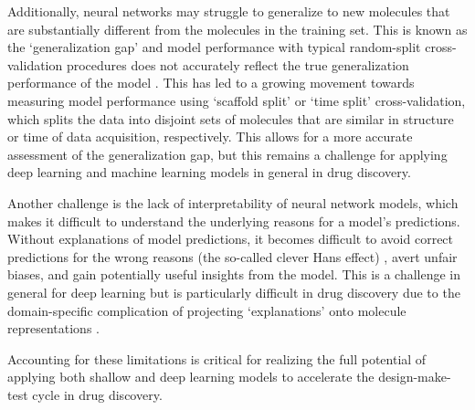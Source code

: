 Additionally, neural networks may struggle to generalize to new molecules that are substantially different from the molecules in the training set. This is known as the `generalization gap' and model performance with typical random-split cross-validation procedures does not accurately reflect the true generalization performance of the model \cite{Sheridan2013TimeSplit}. This has led to a growing movement towards measuring model performance using `scaffold split' \cite{wu2017molnet, yang2019chemprop} or `time split' \cite{Sheridan2013TimeSplit} cross-validation, which splits the data into disjoint sets of molecules that are similar in structure or time of data acquisition, respectively. This allows for a more accurate assessment of the generalization gap, but this remains a challenge for applying deep learning and machine learning models in general in drug discovery.

Another challenge is the lack of interpretability of neural network models, which makes it difficult to understand the underlying reasons for a model's predictions. Without explanations of model predictions, it becomes difficult to avoid correct predictions for the wrong reasons (the so-called clever Hans effect) \cite{Lapuschkin2019UnmaskingCleverHans}, avert unfair biases, and gain potentially useful insights from the model. This is a challenge in general for deep learning but is particularly difficult in drug discovery due to the domain-specific complication of projecting `explanations' onto molecule representations \cite{Jimenze2020XAI}.

Accounting for these limitations is critical for realizing the full potential of applying both shallow and deep learning models to accelerate the design-make-test cycle in drug discovery.


